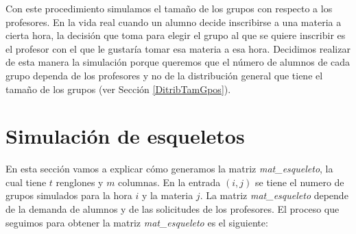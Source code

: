 Con este procedimiento simulamos el tamaño de los grupos con respecto a los profesores. En la vida real cuando un alumno decide inscribirse a una materia a cierta hora, la decisión que toma para elegir el grupo al que se quiere inscribir es el profesor con el que le gustaría tomar esa materia a esa hora. Decidimos realizar de esta manera la simulación porque queremos que el número de alumnos de cada grupo dependa de los profesores y no de la distribución general que tiene el tamaño de los grupos (ver Sección \ref{DitribTamGpos}).





\section{Simulación de esqueletos}

En esta sección vamos a explicar cómo generamos la matriz \textit{mat\_esqueleto}, la cual tiene $t$ renglones y $m$ columnas. En la entrada $(i,j)$ se tiene el numero de grupos simulados para la hora $i$ y la materia $j$. La matriz \textit{mat\_esqueleto} depende de la demanda de alumnos y de las solicitudes de los profesores. El proceso que seguimos para obtener la matriz \textit{mat\_esqueleto} es el siguiente:

